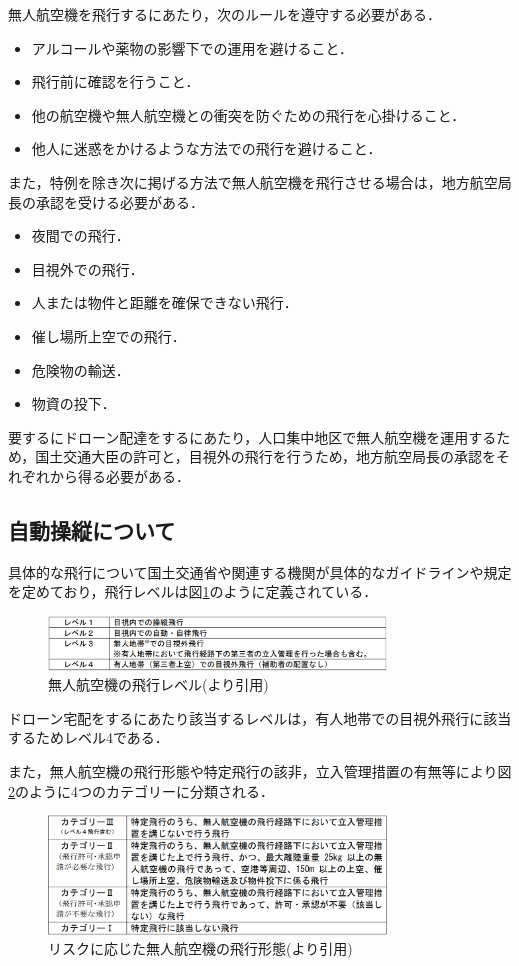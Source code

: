 \documentclass[a4paper, titlepage]{jsarticle}
\begin{document}
無人航空機を飛行するにあたり，次のルールを遵守する必要がある．\cite{prohibited_guidelines}
\begin{itemize}
  \item アルコールや薬物の影響下での運用を避けること．
  \item 飛行前に確認を行うこと．
  \item 他の航空機や無人航空機との衝突を防ぐための飛行を心掛けること．
  \item 他人に迷惑をかけるような方法での飛行を避けること．
\end{itemize}
また，特例を除き次に掲げる方法で無人航空機を飛行させる場合は，地方航空局長の承認を受ける必要がある．
\begin{itemize}
  \item 夜間での飛行．
  \item 目視外での飛行．
  \item 人または物件と距離を確保できない飛行．
  \item 催し場所上空での飛行．
  \item 危険物の輸送．
  \item 物資の投下．
\end{itemize}
要するにドローン配達をするにあたり，人口集中地区で無人航空機を運用するため，国土交通大臣の許可と，目視外の飛行を行うため，地方航空局長の承認をそれぞれから得る必要がある．

\subsection{自動操縦について}
具体的な飛行について国土交通省や関連する機関が具体的なガイドラインや規定を定めており，飛行レベルは図\ref{fig:dron_level}のように定義されている．

\begin{figure}[htbp]
  \centering
  \includegraphics[width=0.8\textwidth]{flying_level.pdf}
  \caption{無人航空機の飛行レベル(\cite{delivery_guidelines_2023}より引用)}
  \label{fig:dron_level}
\end{figure}

ドローン宅配をするにあたり該当するレベルは，有人地帯での目視外飛行に該当するためレベル4である．

また，無人航空機の飛行形態や特定飛行の該非，立入管理措置の有無等により図\ref{fig:dron_category}のように4つのカテゴリーに分類される．
\begin{figure}[htbp]
  \centering
  \includegraphics[width=0.8\textwidth]{dron_category.pdf}
  \caption{リスクに応じた無人航空機の飛行形態(\cite{delivery_guidelines_2023}より引用)}
  \label{fig:dron_category}
\end{figure}
\end{document}
